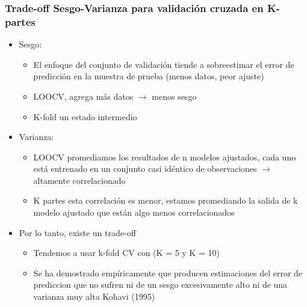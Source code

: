 \documentclass[
  shownotes,
  xcolor={svgnames},
  hyperref={colorlinks,citecolor=DarkBlue,linkcolor=DarkRed,urlcolor=DarkBlue}
  , aspectratio=169]{beamer}
\begin{document}
\begin{frame}[fragile]
\frametitle{Trade-off Sesgo-Varianza para validación cruzada en K-partes}



\begin{itemize}
  \item Sesgo:
  \medskip
    \begin{itemize}
      \item El enfoque del conjunto de validación tiende a sobreestimar el error de predicción en la muestra de prueba (menos datos, peor ajuste)
      \item LOOCV, agrega más datos $ \rightarrow $ menos sesgo 
      \item K-fold un estado intermedio
    \end{itemize}
    \item Varianza:
    \begin{itemize}
      \item LOOCV promediamos los resultados de n modelos ajustados, cada uno está entrenado en un conjunto casi idéntico de observaciones $ \rightarrow $ altamente correlacionado
      \item K partes esta correlación es menor, estamos promediando la salida de k modelo ajustado que están algo menos correlacionados
    \end{itemize}
    \medskip
  \item Por lo tanto, existe un trade-off
  \medskip
    \begin{itemize}
      \item Tendemos a usar k-fold CV con (K = 5 y K = 10)
      \item Se ha demostrado empíricamente que producen estimaciones del error de prediccion que no sufren ni de un sesgo excesivamente alto ni de una varianza muy alta Kohavi (1995)
    \end{itemize}
\end{itemize}

\end{frame}
\end{document}
